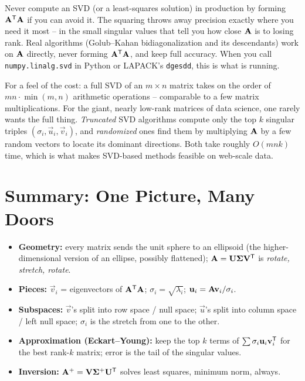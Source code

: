 \begin{trapbox}
Never compute an SVD (or a least-squares solution) in production by forming
$\mathbf{A}^{\mathsf{T}}\mathbf{A}$ if you can avoid it. The squaring throws away precision exactly
where you need it most -- in the small singular values that tell you how close
$\mathbf{A}$ is to losing rank. Real algorithms (Golub--Kahan bidiagonalization and its
descendants) work on $\mathbf{A}$ directly, never forming $\mathbf{A}^{\mathsf{T}}\mathbf{A}$, and
keep full accuracy. When you call \texttt{numpy.linalg.svd} in Python or LAPACK's
\texttt{dgesdd}, this is what is running.
\end{trapbox}

For a feel of the cost: a full SVD of an $m\times n$ matrix takes on the order of
$mn\cdot\min(m,n)$ arithmetic operations -- comparable to a few matrix
multiplications. For the giant, nearly low-rank matrices of data science, one
rarely wants the full thing. \emph{Truncated} SVD algorithms compute only the
top $k$ singular triples $(\sigma_i, \vec{u}_i, \vec{v}_i)$, and
\emph{randomized} ones find them by multiplying $\mathbf{A}$ by a few random vectors
to locate its dominant directions. Both take roughly $O(mnk)$ time, which
is what makes SVD-based methods feasible on web-scale data.

\section{Summary: One Picture, Many Doors}
\label{ch29:summary}

\begin{focusbox}
\begin{itemize}
  \item \textbf{Geometry:} every matrix sends the unit sphere to an ellipsoid
        (the higher-dimensional version of an ellipse, possibly flattened);
        $\mathbf{A} = \mathbf{U}\mathbf{\Sigma}\mathbf{V}^{\mathsf{T}}$ is \emph{rotate, stretch,
        rotate}.
  \item \textbf{Pieces:} $\vec{v}_i$ = eigenvectors of $\mathbf{A}^{\mathsf{T}}\mathbf{A}$;
        $\sigma_i = \sqrt{\lambda_i}$; $\mathbf{u}_i = \mathbf{A}\mathbf{v}_i/\sigma_i$.
  \item \textbf{Subspaces:} $\vec{v}$'s split into row space / null space;
        $\vec{u}$'s split into column space / left null space; $\sigma_i$ is the
        stretch from one to the other.
  \item \textbf{Approximation (Eckart--Young):} keep the top $k$ terms of
        $\sum \sigma_i \mathbf{u}_i\mathbf{v}_i^{\mathsf{T}}$ for the best rank-$k$ matrix; error
        is the tail of the singular values.
  \item \textbf{Inversion:} $\mathbf{A}^+ = \mathbf{V}\mathbf{\Sigma}^+\mathbf{U}^{\mathsf{T}}$ solves
        least squares, minimum norm, always.
\end{itemize}
\end{focusbox}

